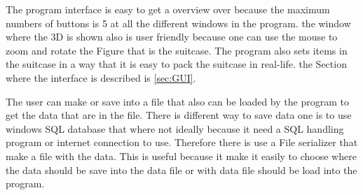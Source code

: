 The program interface is easy to get a overview over because the maximum numbers of buttons is 5 at all the different windows in the program. the window where the 3D is shown also is user friendly because one can use the mouse to zoom and rotate the Figure that is the suitcase. The program also sets items in the suitcase in a way that it is easy to pack the suitcase in real-life. the Section where the interface is described is \ref{sec:GUI}.

The user can make or save into a file that also can be loaded by the program to get the data that are in the file. There is different way to save data one is to use windows SQL database that where not ideally because it need a SQL handling program or internet connection to use. Therefore there is use a File serializer that make a file with the data. This is useful because it make it easily to choose where the data should be save into the data file or with data file should be load into the program.
